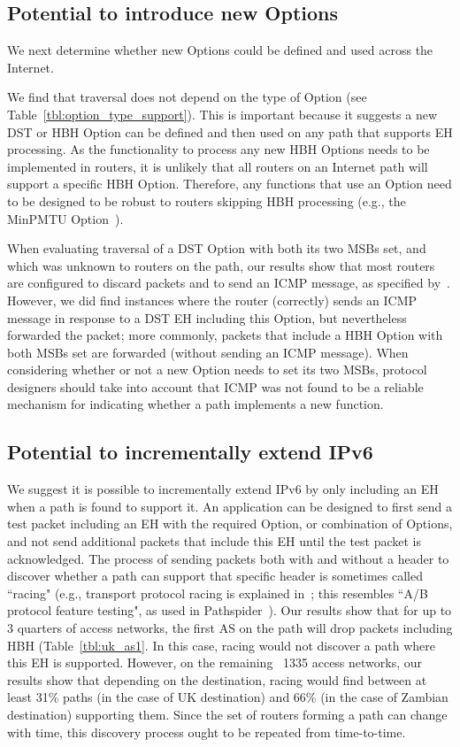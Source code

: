 \documentclass[conference]{IEEEtran}
\begin{document}
\subsection{Potential to introduce new Options}

We next determine whether new Options could be defined and used across the Internet.

We find that traversal does not depend on the type of Option  (see Table~\ref{tbl:option_type_support}). This is important because it suggests a new DST or HBH Option can be defined and then used on any path that supports EH processing. 
As the functionality to process any new HBH Options needs to be implemented in routers, it is unlikely that all routers on an Internet path will support a specific HBH Option. Therefore, any functions that use an Option need to be designed to be robust to routers skipping HBH processing (e.g., the MinPMTU  Option~\cite{rfc9268,rfc9343}). 

When evaluating traversal of a DST Option with both its two MSBs set, and which was unknown to routers on the path, our results show that most routers are configured to discard packets and to send an ICMP message, as specified by~\cite{RFC4443}. However, we did find instances where the router (correctly) sends an ICMP message in response to a DST EH including this Option, but nevertheless forwarded the packet; more commonly, packets that include a HBH Option with both MSBs set are forwarded (without sending an ICMP message). When considering whether or not a new Option needs to set its two MSBs, protocol designers should take into account that ICMP was not found to be a reliable mechanism for indicating whether a path implements a new function.

\subsection{Potential to incrementally extend IPv6}


We suggest it is possible to incrementally extend IPv6 by only including an EH when a path is found to support it. 
An application can be designed to first send a test packet including an EH with the required Option, or combination of Options, and not send additional packets that include this EH until the test packet is acknowledged. The process of sending packets both with and without a header to discover whether a path can support that specific header is sometimes called ``racing" (e.g., transport protocol racing is explained in~\cite{ietf-taps-arch-18}; this resembles ``A/B protocol feature testing", as used in Pathspider~\cite{learmonth2016pathspider}). Our results show that for up to 3 quarters of access networks, the first AS on the path will drop packets including HBH (Table~\ref{tbl:uk_as1}. In this case, racing would not discover a path where this EH is supported. However, on the remaining ~1335 access networks, our results show that depending on the destination, racing would find between at least 31\% paths (in the case of UK destination) and 66\% (in the case of Zambian destination) supporting them.
Since the set of routers forming a path can change with time, this discovery process ought to be repeated from time-to-time. 
\end{document}
